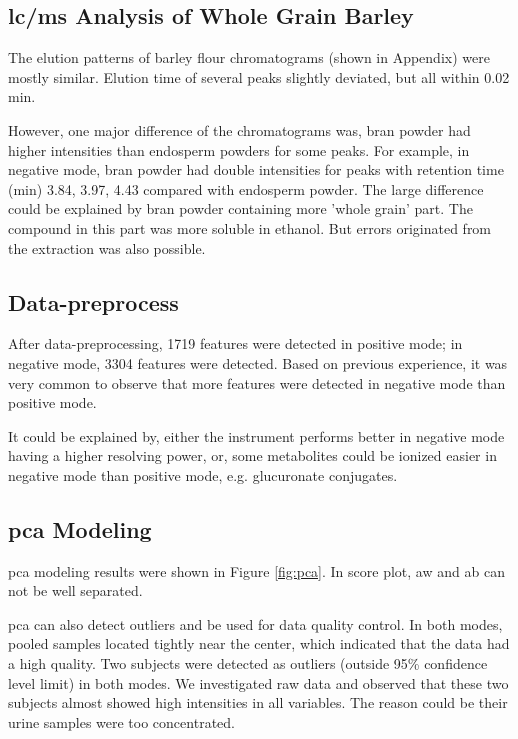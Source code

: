 \subsection{\acrshort{lc/ms} Analysis of Whole Grain Barley}
The elution patterns of barley flour chromatograms (shown in Appendix) were mostly similar. Elution time of several peaks slightly deviated, but all within 0.02 min.

However, one major difference of the chromatograms was, bran powder had higher intensities than endosperm powders for some peaks. For example, in negative mode, bran powder had double intensities for peaks with retention time (min) 3.84, 3.97, 4.43 compared with endosperm powder.
The large difference could be explained by bran powder containing more 'whole grain' part. The compound in this part was more soluble in ethanol. But errors originated from the extraction was also possible.

\subsection{Data-preprocess}
After data-preprocessing, 1719 features were detected in positive mode; in negative mode, 3304 features were detected. 
Based on previous experience, it was very common to observe that more features were detected in negative mode than positive mode.

It could be explained by, either the instrument performs better in negative mode having a higher resolving power, or, some metabolites could be ionized easier in negative mode than positive mode, e.g. glucuronate conjugates.

\subsection{\acrshort{pca} Modeling}
\acrshort{pca} modeling results were shown in Figure \ref{fig:pca}. In score plot, \acrfull{aw} and \acrfull{ab} can not be well separated. 

\acrshort{pca} can also detect outliers and be used for data quality control\cite{Scalbert2014}. 
In both modes, pooled samples located tightly near the center, which indicated that the data had a high quality. 
Two subjects were detected as outliers (outside 95\% confidence level limit) in both modes. 
We investigated raw data and observed that these two subjects almost showed high intensities in all variables. 
The reason could be their urine samples were too concentrated.

